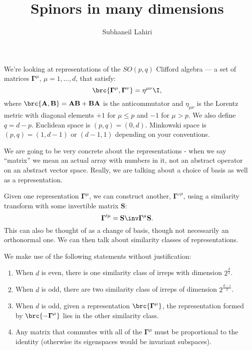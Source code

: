 \documentclass[11pt]{article}
\newcommand{\Gammab}{\boldsymbol{\Gamma}}
\renewcommand{\S}{\mathbf{S}}
\newcommand{\A}{\mathbf{A}}
\newcommand{\B}{\mathbf{B}}
\begin{document}
\title{Spinors in many dimensions}
\author{Subhaneil Lahiri}
\date{}
\maketitle

We're looking at representations of the $SO(p,q)$ Clifford algebra --- a set of matrices $\Gammab^\mu$, $\mu = 1, ..., d$, that satisfy:
%
\begin{equation}\label{eq:clifford}
  \brc{ \Gammab^\mu, \Gammab^\nu } = \eta^{\mu\nu} \I,
\end{equation}
%
where $\brc{ \A, \B } = \A\B + \B\A$ is the anticommutator and $\eta_{\mu\nu}$ is the Lorentz metric with diagonal elements $+1$ for $\mu \leq p$ and $-1$ for $\mu > p$. We also define $q = d - p$.
Euclidean space is \( (p,q) = (0,d) \).
Minkowski space is \( (p,q) = (1,d-1) \) or \( (d-1,1) \) depending on your conventions.

We are going to be very concrete about the representations - when we say ``matrix'' we mean an actual array with numbers in it, not an abstract operator on an abstract vector space.
Really, we are talking about a choice of basis as well as a representation.

Given one representation $\Gammab^\mu$, we can construct another, $\Gammab'^{\mu}$, using a similarity transform with some invertible matrix $\S$:
%
\begin{equation}\label{eq:similarity}
  \Gammab'^{\mu} = \S\inv \Gammab^\mu \S.
\end{equation}
%
This can also be thought of as a change of basis, though not necessarily an orthonormal one.
We can then talk about similarity classes of representations.

We make use of the following statements without justification:
%
\begin{enumerate}
  \item When $d$ is even, there is one similarity class of irreps with dimension $2^{\frac{d}{2}}$.
      \label{it:even}
  \item When $d$ is odd, there are two similarity class of irreps of dimension $2^{\frac{d-1}{2}}$.
      \label{it:odd}
  \item When $d$ is odd, given a representation $\brc{\Gammab^\mu}$, the representation formed by $\brc{ -\Gammab^\mu }$ lies in the other similarity class.
      \label{it:oddchi}
  \item Any matrix that commutes with all of the $\Gammab^\mu$ must be proportional to the identity (otherwise its eigenspaces would be invariant subspaces).
      \label{it:commute}
\end{enumerate}
\end{document}

